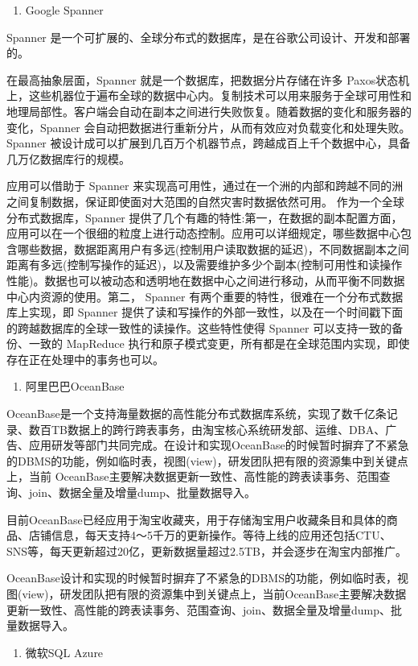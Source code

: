 \begin{enumerate}
	\item Google Spanner
\end{enumerate}

	Spanner 是一个可扩展的、全球分布式的数据库，是在谷歌公司设计、开发和部署的。
	
	在最高抽象层面，Spanner 就是一个数据库，把数据分片存储在许多 Paxos状态机上，这些机器位于遍布全球的数据中心内。复制技术可以用来服务于全球可用性和地理局部性。客户端会自动在副本之间进行失败恢复。随着数据的变化和服务器的变化，Spanner 会自动把数据进行重新分片，从而有效应对负载变化和处理失败。Spanner 被设计成可以扩展到几百万个机器节点，跨越成百上千个数据中心，具备几万亿数据库行的规模。
	
	应用可以借助于 Spanner 来实现高可用性，通过在一个洲的内部和跨越不同的洲之间复制数据，保证即使面对大范围的自然灾害时数据依然可用。
	作为一个全球分布式数据库，Spanner 提供了几个有趣的特性:第一，在数据的副本配置方面，应用可以在一个很细的粒度上进行动态控制。应用可以详细规定，哪些数据中心包含哪些数据，数据距离用户有多远(控制用户读取数据的延迟)，不同数据副本之间距离有多远(控制写操作的延迟)，以及需要维护多少个副本(控制可用性和读操作性能)。数据也可以被动态和透明地在数据中心之间进行移动，从而平衡不同数据中心内资源的使用。第二， Spanner 有两个重要的特性，很难在一个分布式数据库上实现，即 Spanner 提供了读和写操作的外部一致性，以及在一个时间戳下面的跨越数据库的全球一致性的读操作。这些特性使得 Spanner 可以支持一致的备份、一致的 MapReduce 执行和原子模式变更，所有都是在全球范围内实现，即使存在正在处理中的事务也可以。
	
	\begin{enumerate}[resume]
		\item 阿里巴巴OceanBase
	\end{enumerate}
	
	
	OceanBase是一个支持海量数据的高性能分布式数据库系统，实现了数千亿条记录、数百TB数据上的跨行跨表事务，由淘宝核心系统研发部、运维、DBA、广告、应用研发等部门共同完成。在设计和实现OceanBase的时候暂时摒弃了不紧急的DBMS的功能，例如临时表，视图(view)，研发团队把有限的资源集中到关键点上，当前 OceanBase主要解决数据更新一致性、高性能的跨表读事务、范围查询、join、数据全量及增量dump、批量数据导入。
	
	目前OceanBase已经应用于淘宝收藏夹，用于存储淘宝用户收藏条目和具体的商品、店铺信息，每天支持4～5千万的更新操作。等待上线的应用还包括CTU、SNS等，每天更新超过20亿，更新数据量超过2.5TB，并会逐步在淘宝内部推广。
	
	OceanBase设计和实现的时候暂时摒弃了不紧急的DBMS的功能，例如临时表，视图(view)，研发团队把有限的资源集中到关键点上，当前OceanBase主要解决数据更新一致性、高性能的跨表读事务、范围查询、join、数据全量及增量dump、批量数据导入。
	\begin{enumerate}[resume]
		\item 微软SQL Azure
	\end{enumerate}
	
